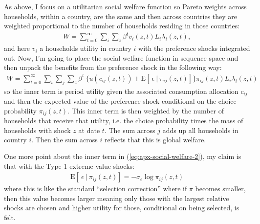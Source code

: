 \documentclass[12pt,pdftex]{article}
\begin{document}
\begin{onehalfspacing}
As above, I focus on a utilitarian social welfare function so Pareto weights across households, within a country, are the same and then across countries they are weighted proportional to the number of households residing in those countries:
\begin{align}
W = \sum_{t=0}^{\infty} \sum_{i} \sum_{z} \beta^{t} v_{i}(z,t) L_{i}\lambda_{i}(z,t),
\label{eq:apx-social-welfare}
\end{align}
and here $v_i$ a households utility in country $i$ with the preference shocks integrated out. Now, I'm going to place the social welfare function in sequence space and then unpack the benefits from the preference shock in the following way:
\begin{align}
W = \sum_{t=0}^{\infty}  \sum_{i} \sum_{j} \sum\limits_{z}  \beta^{t} \  \bigg \{  u(c_{ij}(z, t) ) + \mathrm{E}[ \ \epsilon \ | \ \pi_{ij}(z,t) ] \bigg \}\pi_{ij}(z,t) L_{i} \lambda_{i}(z, t)
\label{eq:apx-social-welfare-2}
\end{align}
so the inner term is period utility given the associated consumption allocation $c_{ij}$ and then the expected value of the preference shock conditional on the choice probability $\pi_{ij}(z,t)$. This inner term is then weighted by the number of households that receive that utility, i.e. the choice probability times the mass of households with shock $z$ at date $t$. The sum across $j$ adds up all households in country $i$. Then the sum across $i$ reflects that this is global welfare.

One more point about the inner term in (\ref{eq:apx-social-welfare-2}), my claim is that with the Type 1 extreme value shocks:
\begin{align}
\mathrm{E}[ \ \epsilon \ | \ \pi_{ij}(z,t) ] = -\sigma_{\epsilon} \log \pi_{ij}(z,t)
\end{align}
where this is like the standard ``selection correction'' where if $\pi$ becomes smaller, then this value becomes larger meaning only those with the largest relative shocks are chosen and higher utility for those, conditional on being selected, is felt.


\end{onehalfspacing}
\end{document}
